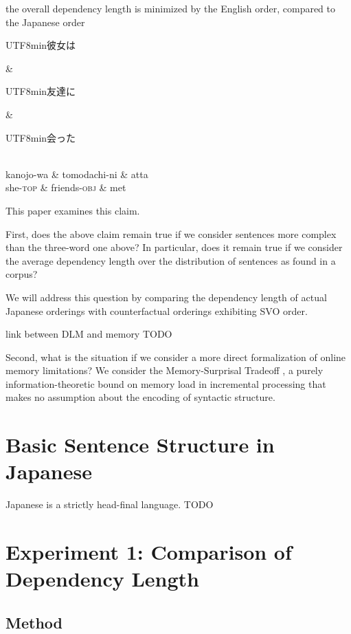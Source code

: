 \documentclass[11pt,a4paper]{article}
\newcommand{\japanese}[1]{\begin{CJK}{UTF8}{min}#1\end{CJK}}
\begin{document}
the overall dependency length is minimized by the English order, compared to the Japanese order

\begin{centering}
\begin{dependency}[theme = simple]
   \begin{deptext}[column sep=1em]
          \japanese{彼女は} \& \japanese{友達に} \& \japanese{会った}  \\
          kanojo-wa \& tomodachi-ni \& atta \\ 
          she-\textsc{top} \& friends-\textsc{obj} \& met \\
   \end{deptext}
\end{dependency}
\end{centering}


This paper examines this claim.

First, does the above claim remain true if we consider sentences more complex than the three-word one above?
In particular, does it remain true if we consider the average dependency length over the distribution of sentences as found in a corpus?

We will address this question by comparing the dependency length of actual Japanese orderings with counterfactual orderings exhibiting SVO order.

link between DLM and memory TODO

Second, what is the situation if we consider a more direct formalization of online memory limitations?
We consider the Memory-Surprisal Tradeoff \citep{hahn2019memory}, a purely information-theoretic bound on memory load in incremental processing that makes no assumption about the encoding of syntactic structure.

\section{Basic Sentence Structure in Japanese}

Japanese is a strictly head-final language.
TODO


\section{Experiment 1: Comparison of Dependency Length}

\subsection{Method}
\end{document}
